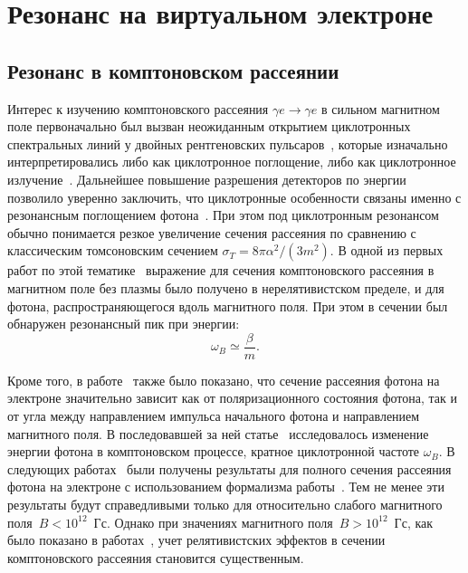 \section{Резонанс на виртуальном электроне}\label{sec:resonance}
\subsection{Резонанс в комптоновском рассеянии}
Интерес к изучению комптоновского рассеяния $\gamma e \to \gamma e$ в 
сильном магнитном поле первоначально был вызван неожиданным открытием циклотронных 
спектральных линий у двойных рентгеновских 
пульсаров~\cite{Truemper1978,Makishima1990,Grove1995}, которые изначально 
интерпретировались либо как циклотронное поглощение, либо как циклотронное 
излучение~\cite{Truemper1978}. Дальнейшее повышение разрешения детекторов по 
энергии позволило уверенно заключить, что циклотронные особенности связаны 
именно с резонансным поглощением фотона~\cite{Mihara:1990}.
При этом под циклотронным резонансом обычно понимается 
резкое увеличение сечения рассеяния по сравнению с классическим томсоновским 
сечением $\sigma_T = 8 \pi \alpha^2 /(3 m^2)$. В одной из первых 
работ по этой тематике~\cite{Canuto:1971} выражение для сечения 
комптоновского 
рассеяния в магнитном поле без плазмы было получено
в нерелятивистском пределе, и для фотона, 
распространяющегося вдоль магнитного поля. При этом в сечении был обнаружен резонансный 
пик при энергии:
\begin{equation}\label{eq:w_B}
	\omega_B\simeq \frac{\beta}{m}.
\end{equation}
 
Кроме того, в работе~\cite{Canuto:1971} также было показано, что сечение рассеяния фотона 
на электроне
значительно зависит как от поляризационного состояния фотона, так и от угла 
между направлением импульса начального фотона и направлением магнитного поля. В 
последовавшей за ней 
статье~\cite{Gnedin1973} 
исследовалось изменение энергии фотона в комптоновском процессе, кратное 
циклотронной частоте $\omega_B$. 
В следующих работах~\cite{Borner1979,Ventura:1979} 
были получены результаты для полного сечения рассеяния фотона на электроне с использованием формализма работы~\cite{Canuto:1971}. Тем не менее эти результаты будут справедливыми только для относительно слабого магнитного поля~$B<10^{12}$~Гс. Однако при значениях магнитного поля~$B>10^{12}$~Гс, как было показано в работах~\cite{Herold:1979,Melrose:1983III},   учет релятивистских эффектов в сечении комптоновского рассеяния становится 
существенным.

